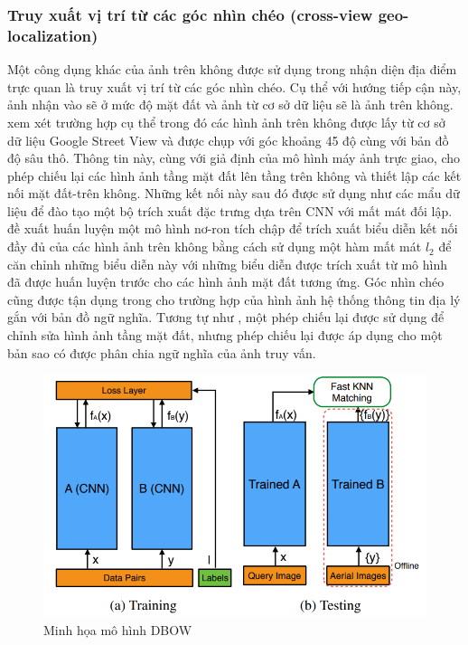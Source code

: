 \subsubsection{Truy xuất vị trí từ các góc nhìn chéo (cross-view geo-localization)}
Một công dụng khác của ảnh trên không được sử dụng trong nhận diện địa điểm trực quan là truy xuất vị trí từ các góc nhìn chéo. Cụ thể với hướng tiếp cận này, ảnh nhận vào sẽ ở mức độ mặt đất và ảnh từ cơ sở dữ liệu sẽ là ảnh trên không. \cite{Lin2015LearningDR} xem xét trường hợp cụ thể trong đó các hình ảnh trên không được lấy từ cơ sở dữ liệu Google Street View và được chụp với góc khoảng 45 độ cùng với bản đồ độ sâu thô. Thông tin này, cùng với giả định của mô hình máy ảnh trực giao, cho phép chiếu lại các hình ảnh tầng mặt đất lên tầng trên không và thiết lập các kết nối mặt đất-trên không. Những kết nối này sau đó được sử dụng như các mẩu dữ liệu để đào tạo một bộ trích xuất đặc trưng dựa trên CNN với mất mát đối lập. \cite{workman2015widearea} đề xuất huấn luyện một mô hình nơ-ron tích chập để trích xuất biểu diễn kết nối đầy đủ của các hình ảnh trên không bằng cách sử dụng một hàm mất mát $l_2$ để căn chỉnh những biểu diễn này với những biểu diễn được trích xuất từ mô hình đã được huấn luyện trước cho các hình ảnh mặt đất tương ứng. Góc nhìn chéo cũng được tận dụng trong \cite{Castaldo2015SemanticCM} cho trường hợp của hình ảnh hệ thống thông tin địa lý gắn với bản đồ ngữ nghĩa. Tương tự như \cite{Lin2015LearningDR}, một phép chiếu lại được sử dụng để chỉnh sửa hình ảnh tầng mặt đất, nhưng phép chiếu lại được áp dụng cho một bản sao có được phân chia ngữ nghĩa của ảnh truy vấn.

\begin{figure}[H]
    \centering
    \includegraphics[width=\textwidth]{pics/Chapter2/wherecnn.png}
    \caption{Minh họa mô hình DBOW \cite{Lin2015LearningDR}}
\end{figure}